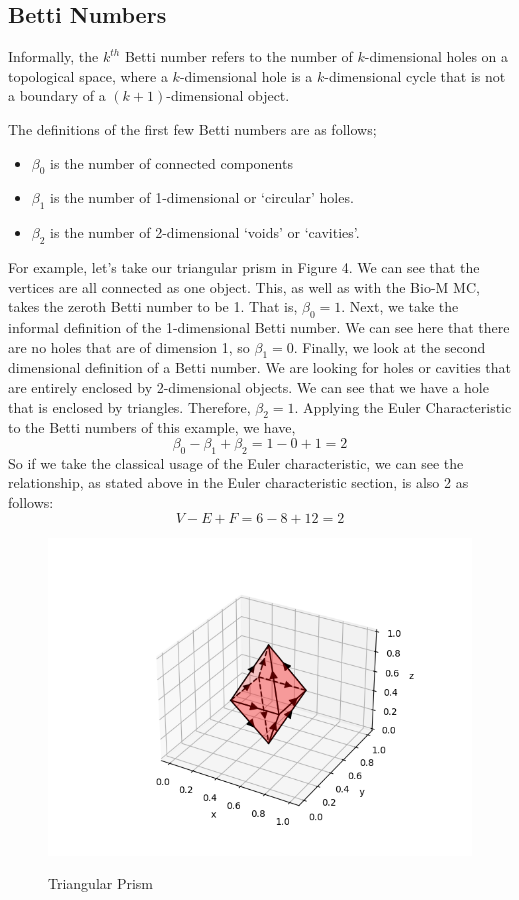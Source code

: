 \subsection{Betti Numbers}
Informally, the $k^{th}$ Betti number refers to the number of $k$-dimensional holes on a topological space, where a $k$-dimensional hole is a $k$-dimensional cycle that is not a boundary of a $(k+1)$-dimensional object.

The definitions of the first few Betti numbers are as follows;
\begin{itemize}
    \item $\beta_0$ is the number of connected components
    \item $\beta_1$ is the number of 1-dimensional or `circular' holes.
    \item $\beta_2$ is the number of 2-dimensional `voids' or `cavities'.
\end{itemize}
For example, let's take our triangular prism in Figure 4. We can see that the vertices are all connected as one object. This, as well as with the Bio-M MC, takes the zeroth Betti number to be 1. That is, $\beta_0 = 1$. Next, we take the informal definition of the 1-dimensional Betti number. We can see here that there are no holes that are of dimension 1, so $\beta_1 = 0$. Finally, we look at the second dimensional definition of a Betti number. We are looking for holes or cavities that are entirely enclosed by 2-dimensional objects. We can see that we have a hole that is enclosed by triangles. Therefore, $\beta_2 = 1$. Applying the Euler Characteristic to the Betti numbers of this example, we have,
\begin{equation}
    \beta_0 - \beta_1 + \beta_2 = 1 - 0 + 1 = 2
\end{equation}
So if we take the classical usage of the Euler characteristic, we can see the relationship, as stated above in the Euler characteristic section, is also 2 as follows:
\begin{equation}
    V - E + F = 6 - 8 + 12 = 2
\end{equation}

\begin{figure}[H]%
    \centering
    \captionsetup{justification=centering}
{{\includegraphics[width=12cm]{graph/simplex_structure.png} }}%
    \caption{Triangular Prism}
    \label{fig:example}%
\end{figure}

